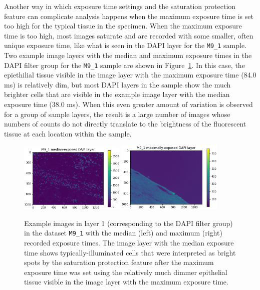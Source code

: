 \documentclass[letterpaper,11pt]{article}
\newcommand{\reffig}[1]{Figure~\ref{#1}}
\begin{document}
Another way in which exposure time settings and the saturation protection feature can complicate analysis happens when the maximum exposure time is set too high for the typical tissue in the specimen. When the maximum exposure time is too high, most images saturate and are recorded with some smaller, often unique exposure time, like what is seen in the DAPI layer for the \texttt{M9\_1} sample. Two example image layers with the median and maximum exposure times in the DAPI filter group for the \texttt{M9\_1} sample are shown in \reffig{fig:med_min_M9_1_dapi_images}. In this case, the epiethilial tissue visible in the image layer with the maximum exposure time (84.0 ms) is relatively dim, but most DAPI layers in the sample show the much brighter cells that are visible in the example image layer with the median exposure time (38.0 ms). When this even greater amount of variation is observed for a group of sample layers, the result is a large number of images whose numbers of counts do not directly translate to the brightness of the fluorescent tissue at each location within the sample.

\begin{figure}[!ht]
\centering
\includegraphics[width=0.45\textwidth]{images/introduction/med_exposure_M9_1_dapi_image}
\includegraphics[width=0.45\textwidth]{images/introduction/max_exposure_M9_1_dapi_image}
\caption{\footnotesize Example images in layer 1 (corresponding to the DAPI filter group) in the dataset \texttt{M9\_1} with the median (left) and maximum (right) recorded exposure times. The image layer with the median exposure time shows typically-illuminated cells that were interpreted as bright spots by the saturation protection feature after the maximum exposure time was set using the relatively much dimmer epithelial tissue visible in the image layer with the maximum exposure time.}
\label{fig:med_min_M9_1_dapi_images}
\end{figure}
\end{document}
